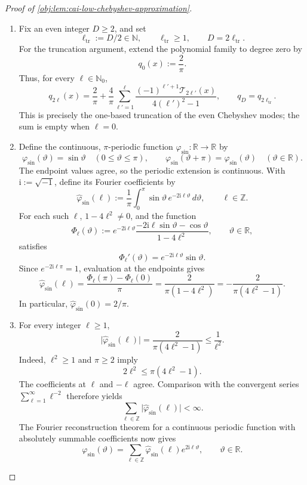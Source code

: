\documentclass[11pt]{article}
\begin{document}
\begin{proof}[Proof of \cref{obj:lem:cai-low-chebyshev-approximation}]
\begin{enumerate}
\item Fix an even integer \(D\ge2\), and set
\[
\ell_{\mathrm{tr}}:=D/2\in\mathbb N,\qquad
\ell_{\mathrm{tr}}\ge1,\qquad D=2\ell_{\mathrm{tr}}.
\]
For the truncation argument, extend the polynomial family to degree zero by
\[
q_0(x):=\frac2\pi.
\]
Thus, for every \(\ell\in\mathbb N_0\),
\[
q_{2\ell}(x)
=\frac2\pi+\frac4\pi\sum_{\ell'=1}^{\ell}
 \frac{(-1)^{\ell'+1}\mathcal T_{2\ell'}(x)}
 {4(\ell')^2-1},
\qquad q_D=q_{2\ell_{\mathrm{tr}}}.
\]
This is precisely the one-based truncation of the even Chebyshev modes; the sum is empty when \(\ell=0\).

\item Define the continuous, \(\pi\)-periodic function \(\varphi_{\sin}:\mathbb R\to\mathbb R\) by
\[
\varphi_{\sin}(\vartheta)=\sin\vartheta
\quad(0\le\vartheta\le\pi),\qquad
\varphi_{\sin}(\vartheta+\pi)=\varphi_{\sin}(\vartheta)
\quad(\vartheta\in\mathbb R).
\]
The endpoint values agree, so the periodic extension is continuous. With \(\mathrm i:=\sqrt{-1}\), define its Fourier coefficients by
\[
\widehat\varphi_{\sin}(\ell)
:=\frac1\pi\int_0^\pi
 \sin\vartheta\,e^{-2\mathrm i\ell\vartheta}\,d\vartheta,
\qquad \ell\in\mathbb Z.
\]
For each such \(\ell\), \(1-4\ell^2\ne0\), and the function
\[
\Phi_\ell(\vartheta)
:=e^{-2\mathrm i\ell\vartheta}
 \frac{-2\mathrm i\ell\sin\vartheta-\cos\vartheta}
 {1-4\ell^2},
\qquad \vartheta\in\mathbb R,
\]
satisfies
\[
\Phi_\ell'(\vartheta)
=e^{-2\mathrm i\ell\vartheta}\sin\vartheta.
\]
Since \(e^{-2\mathrm i\ell\pi}=1\), evaluation at the endpoints gives
\[
\widehat\varphi_{\sin}(\ell)
=\frac{\Phi_\ell(\pi)-\Phi_\ell(0)}{\pi}
=\frac{2}{\pi(1-4\ell^2)}
=-\frac{2}{\pi(4\ell^2-1)}.
\]
In particular, \(\widehat\varphi_{\sin}(0)=2/\pi\).

\item For every integer \(\ell\ge1\),
\[
\bigl|\widehat\varphi_{\sin}(\ell)\bigr|
=\frac{2}{\pi(4\ell^2-1)}
\le\frac1{\ell^2}.
\]
Indeed, \(\ell^2\ge1\) and \(\pi\ge2\) imply
\[
2\ell^2\le\pi(4\ell^2-1).
\]
The coefficients at \(\ell\) and \(-\ell\) agree. Comparison with the convergent series \(\sum_{\ell=1}^\infty\ell^{-2}\) therefore yields
\[
\sum_{\ell\in\mathbb Z}
 \bigl|\widehat\varphi_{\sin}(\ell)\bigr|<\infty.
\]
The Fourier reconstruction theorem for a continuous periodic function with absolutely summable coefficients now gives
\[
\varphi_{\sin}(\vartheta)
=\sum_{\ell\in\mathbb Z}
 \widehat\varphi_{\sin}(\ell)e^{2\mathrm i\ell\vartheta},
\qquad \vartheta\in\mathbb R.
\]


\end{enumerate}
\end{proof}
\end{document}
